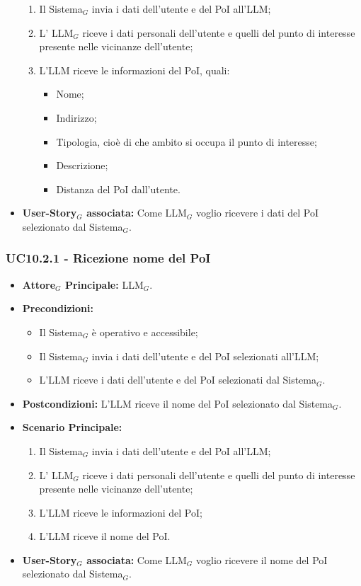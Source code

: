 \documentclass[10pt]{article}
\begin{document}
\begin{justify}
\begin{itemize}
\begin{enumerate}
          \item Il Sistema$_G$ invia i dati dell'utente e del PoI all'LLM;
          \item L' LLM$_G$ riceve i dati personali dell'utente e quelli del punto di interesse presente nelle vicinanze dell'utente;
          \item L'LLM riceve le informazioni del PoI, quali:
          \begin{itemize}
          \item Nome;
          \item Indirizzo;
          \item Tipologia, cioè di che ambito si occupa il punto di interesse;
          \item Descrizione;
          \item Distanza del PoI dall'utente.
          \end{itemize}
        \end{enumerate}
      \item \textbf{User-Story$_G$ associata:} Come LLM$_G$ voglio ricevere i dati del PoI selezionato dal Sistema$_G$.
\end{itemize}
\subsubsection{\textbf{UC10.2.1 - Ricezione nome del PoI}}
\begin{itemize}
    \item \textbf{Attore$_G$ Principale:} LLM$_G$.
    \item \textbf{Precondizioni:} 
        \begin{itemize}
          \item Il Sistema$_G$ è operativo e accessibile;
          \item Il Sistema$_G$ invia i dati dell'utente e del PoI selezionati all'LLM;
            \item L'LLM riceve i dati dell'utente e del PoI selezionati dal Sistema$_G$.
        \end{itemize}
      \item \textbf{Postcondizioni:} L'LLM riceve il nome del PoI selezionato dal Sistema$_G$.
    \item \textbf{Scenario Principale:} 
        \begin{enumerate}
          \item Il Sistema$_G$ invia i dati dell'utente e del PoI all'LLM;
        \item L' LLM$_G$ riceve i dati personali dell'utente e quelli del punto di interesse presente nelle vicinanze dell'utente;
          \item L'LLM riceve le informazioni del PoI;
          \item L'LLM riceve il nome del PoI.
        \end{enumerate}
      \item \textbf{User-Story$_G$ associata:} Come LLM$_G$ voglio ricevere il nome del PoI selezionato dal Sistema$_G$.
\end{itemize}

\end{justify}
\end{document}
